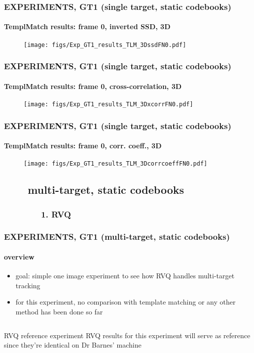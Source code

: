 \begin{frame}
\frametitle{\small EXPERIMENTS, GT1 (single target, static codebooks)}
\framesubtitle{TemplMatch results: frame 0, inverted SSD, 3D}
\mypagenum
	\begin{figure}
		\texttt{[image: figs/Exp\_GT1\_results\_TLM\_3DssdFN0.pdf]}
	\end{figure}
\end{frame}



\begin{frame}
\frametitle{\small EXPERIMENTS, GT1 (single target, static codebooks)}
\framesubtitle{TemplMatch results: frame 0, cross-correlation, 3D}
\mypagenum
	\begin{figure}
		\texttt{[image: figs/Exp\_GT1\_results\_TLM\_3DxcorrFN0.pdf]}
	\end{figure}
\end{frame}


\begin{frame}
\frametitle{\small EXPERIMENTS, GT1 (single target, static codebooks)}
\framesubtitle{TemplMatch results: frame 0,  corr. coeff., 3D}
\mypagenum
	\begin{figure}
		\texttt{[image: figs/Exp\_GT1\_results\_TLM\_3DcorrcoeffFN0.pdf]}
	\end{figure}
\end{frame}



\subsection{\ \ \ \ multi-target, static codebooks}

\subsubsection{\ \ \ \ \ \ \ \ 1. RVQ}
\begin{frame}
\frametitle{\small EXPERIMENTS, GT1 (multi-target, static codebooks)}
\framesubtitle{overview}
\mypagenum
	\begin{itemize}
		\item goal: simple one image experiment to see how RVQ handles multi-target tracking
		\item for this experiment, no comparison with template matching or any other method has been done so far
	\end{itemize}
	\begin{columns}
		\column{3in}
			\begin{block}{RVQ reference experiment}
				RVQ results for this experiment will serve as reference since they're identical on Dr Barnes' machine
			\end{block}
	\end{columns}
\end{frame}



